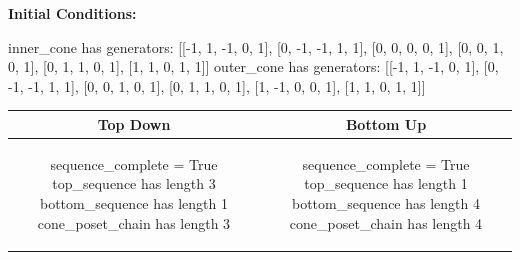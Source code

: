 \documentclass[10pt]{article}
\begin{document}
\textbf{Initial Conditions:}
\begin{SAGE}
inner_cone has generators: 
[[-1, 1, -1, 0, 1], [0, -1, -1, 1, 1], [0, 0, 0, 0, 1], [0, 0, 1, 0, 1], [0, 1, 1, 0, 1], [1, 1, 0, 1, 1]]
outer_cone has generators: 
[[-1, 1, -1, 0, 1], [0, -1, -1, 1, 1], [0, 0, 1, 0, 1], [0, 1, 1, 0, 1], [1, -1, 0, 0, 1], [1, 1, 0, 1, 1]]

\end{SAGE}
\begin{tabular}{c|c}
\textbf{Top Down} & \textbf{Bottom Up} \\ \hline  
\begin{SAGE}
sequence_complete = True
top_sequence has length 3
bottom_sequence has length 1
cone_poset_chain has length 3
\end{SAGE} 
&
\begin{SAGE}
sequence_complete = True
top_sequence has length 1
bottom_sequence has length 4
cone_poset_chain has length 4
\end{SAGE} 
\\ \hline


\end{tabular}
\end{document}
